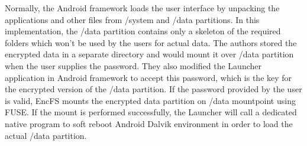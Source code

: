 Normally, the Android framework loads the user interface by unpacking the applications and other files from /system and /data partitions. In this implementation, the /data partition contains only a skeleton of the required folders which won’t be used by the users for actual data. The authors stored the encrypted data in a separate directory and would mount it over /data partition when the user supplies the password.
They also modified the Launcher application in Android framework to accept this password, which is the key for the encrypted version of the /data partition. If the password provided by the user is valid, EncFS mounts the encrypted data partition on /data mountpoint using FUSE. If the mount is performed successfully, the Launcher will call a dedicated native program to soft reboot Android Dalvik environment in order to load the actual /data partition.